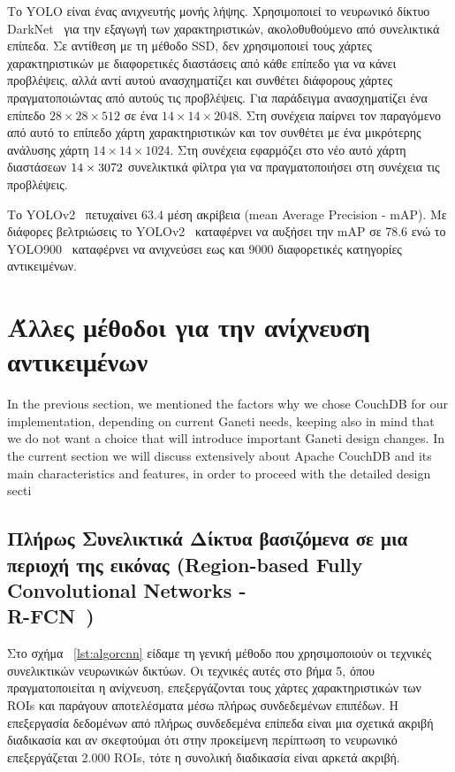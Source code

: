 Το YOLO είναι ένας ανιχνευτής μονής λήψης. Χρησιμοποιεί το νευρωνικό δίκτυο
DarkNet~\cite{darknet13} για την εξαγωγή των χαρακτηριστικών, ακολοθυθούμενο από
συνελικτικά επίπεδα. Σε αντίθεση με τη μέθοδο SSD, δεν χρησιμοποιεί τους χάρτες
χαρακτηριστικών με διαφορετικές διαστάσεις από κάθε επίπεδο για να κάνει προβλέψεις,
αλλά αντί αυτού ανασχηματίζει και συνθέτει διάφορους χάρτες πραγματοποιώντας από
αυτούς τις προβλέψεις. Για παράδειγμα ανασχηματίζει ένα επίπεδο $28 \times 28 \times 512$
σε ένα $14 \times 14 \times 2048$. Στη συνέχεια παίρνει τον παραγόμενο από αυτό το
επίπεδο χάρτη χαρακτηριστικών και τον συνθέτει με ένα μικρότερης ανάλυσης χάρτη
$14 \times 14 \times 1024$. Στη συνέχεια εφαρμόζει στο νέο αυτό χάρτη διαστάσεων
$14 \time 14 \times 3072$ συνελικτικά φίλτρα για να πραγματοποιήσει στη συνέχεια
τις προβλέψεις.

Το YOLOv2~\cite{7780460} πετυχαίνει $63.4$ μέση ακρίβεια (mean Average Precision - mAP).
Με διάφορες βελτριώσεις το YOLOv2~\cite{DBLP:journals/corr/RedmonF16} καταφέρνει να αυξήσει την mAP σε 78.6 ενώ το
YOLO900~\cite{DBLP:journals/corr/RedmonF16} καταφέρνει να ανιχνεύσει εως και 9000 διαφορετικές κατηγορίες αντικειμένων.



\section{Άλλες μέθοδοι για την ανίχνευση αντικειμένων}\label{sec:objmethods}

In the previous section, we mentioned the factors why we chose CouchDB for our
implementation, depending on current Ganeti needs, keeping also in mind that we
do not want a choice that will introduce important Ganeti design changes. In the
current section we will discuss extensively about Apache CouchDB and its main
characteristics and features, in order to proceed with the detailed design
secti

\subsection{Πλήρως Συνελικτικά Δίκτυα βασιζόμενα σε μια περιοχή της εικόνας
(Region-based Fully Convolutional Networks - \\R-FCN~\cite{DBLP:journals/corr/DaiLHS16})}\label{sec:rfcn}

Στο σχήμα ~\ref{lst:algorcnn} είδαμε τη γενική μέθοδο που χρησιμοποιούν οι
τεχνικές συνελικτικών νευρωνικών δικτύων. Οι τεχνικές αυτές στο βήμα 5, όπου
πραγματοποιείται η ανίχνευση, επεξεργάζονται τους χάρτες χαρακτηριστικών των
ROIs και παράγουν αποτελέσματα μέσω πλήρως συνδεδεμένων επιπέδων. Η επεξεργασία
δεδομένων από πλήρως συνδεδεμένα επίπεδα είναι μια σχετικά ακριβή διαδικασία και
αν σκεφτούμαι ότι στην προκείμενη περίπτωση το νευρωνικό επεξεργάζεται 2.000 ROIs,
τότε η συνολική διαδικασία είναι αρκετά ακριβή.
